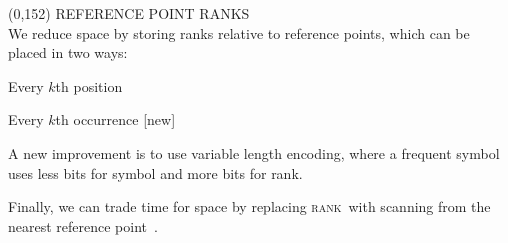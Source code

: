 \documentclass[a4paper]{article} %
\newcommand{\rank}{\textsc{rank}}
\begin{document}
\begin{textblock}{60}(0,152)
  {\sffamily\normalsize{\color{sciorange}
      REFERENCE POINT RANKS}}\vspace{1mm}\\
  \footnotesize 
  We reduce space by storing ranks relative to reference points,
  which can be placed in two ways:\\

  \begin{minipage}[t]{25mm}
    \scriptsize\sffamily
    \centering
    Every $k$th position~\cite{ll2005}
    \begin{center}
      
    \end{center}
  \end{minipage}
  \hfill
  \begin{minipage}[t]{30mm}
    \scriptsize\sffamily
    \centering
    Every $k$th occurrence [new]
    \begin{center}
      
    \end{center}
  \end{minipage}
  \vspace{3mm}

  \begin{minipage}{42mm}
    \raggedright
    A new improvement is to use variable length encoding, where
    a frequent symbol uses less bits for symbol and more bits for rank.
  \end{minipage}
  \hfill
  \begin{minipage}{17mm}
    \begin{center}
      
    \end{center}
  \end{minipage}
  \vspace{1mm}

  Finally, we can trade time for space by replacing \rank\ with
  scanning from the nearest reference point~\cite{ll2005}.
\end{textblock}
\end{document}
